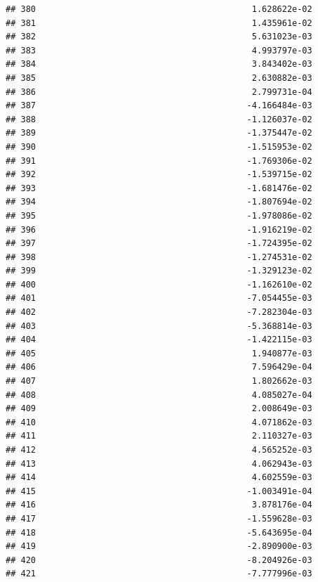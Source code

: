 \documentclass[
]{article}
\begin{document}
\begin{verbatim}
## 380                                           1.628622e-02
## 381                                           1.435961e-02
## 382                                           5.631023e-03
## 383                                           4.993797e-03
## 384                                           3.843402e-03
## 385                                           2.630882e-03
## 386                                           2.799731e-04
## 387                                          -4.166484e-03
## 388                                          -1.126037e-02
## 389                                          -1.375447e-02
## 390                                          -1.515953e-02
## 391                                          -1.769306e-02
## 392                                          -1.539715e-02
## 393                                          -1.681476e-02
## 394                                          -1.807694e-02
## 395                                          -1.978086e-02
## 396                                          -1.916219e-02
## 397                                          -1.724395e-02
## 398                                          -1.274531e-02
## 399                                          -1.329123e-02
## 400                                          -1.162610e-02
## 401                                          -7.054455e-03
## 402                                          -7.282304e-03
## 403                                          -5.368814e-03
## 404                                          -1.422115e-03
## 405                                           1.940877e-03
## 406                                           7.596429e-04
## 407                                           1.802662e-03
## 408                                           4.085027e-04
## 409                                           2.008649e-03
## 410                                           4.071862e-03
## 411                                           2.110327e-03
## 412                                           4.565252e-03
## 413                                           4.062943e-03
## 414                                           4.602559e-03
## 415                                          -1.003491e-04
## 416                                           3.878176e-04
## 417                                          -1.559628e-03
## 418                                          -5.643695e-04
## 419                                          -2.890900e-03
## 420                                          -8.204926e-03
## 421                                          -7.777996e-03

\end{verbatim}
\end{document}
